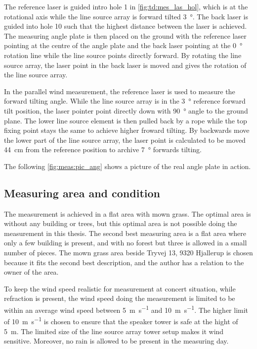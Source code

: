 The reference laser is guided intro hole 1 in \autoref{fig:td:mes_las_hol}, which is at the rotational axis while the line source array is forward tilted \SI{3}{\degree}. The back laser is guided into hole 10 such that the highest distance between the laser is achieved. The measuring angle plate is then placed on the ground with the reference laser pointing at the centre of the angle plate and the back laser pointing at the \SI{0}{\degree} rotation line while the line source points directly forward. By rotating the line source array, the laser point in the back laser is moved and gives the rotation of the line source array.

In the parallel wind measurement, the reference laser is used to measure the forward tilting angle. While the line source array is in the \SI{3}{\degree} reference forward tilt position, the laser pointer point directly down with \SI{90}{\degree} angle to the ground plane. The lower line source element is then pulled back by a rope while the top fixing point stays the same to achieve higher froward tilting. By backwards move the lower part of the line source array, the laser point is calculated to be moved \SI{44}{\centi\meter} from the reference position to archive \SI{7}{\degree} forwards tilting.

The following \autoref{fig:meas:pic_ang} shows a picture of the real angle plate in action.


\subsection{Measuring area and condition}
The measurement is achieved in a flat area with mown grass. The optimal area is without any building or trees, but this optimal area is not possible doing the measurement in this thesis. The second best measuring area is a flat area where only a few building is present, and with no forest but three is allowed in a small number of pieces. The mown grass area beside Tryvej 13, 9320 Hjallerup is chosen because it fits the second best description, and the author has a relation to the owner of the area.


To keep the wind speed realistic for measurement at concert situation, while refraction is present, the wind speed doing the measurement is limited to be within an average wind speed between \SI{5}{\meter\per\second} and \SI{10}{\meter\per\second}. The higher limit of  \SI{10}{\meter\per\second} is chosen to ensure that the speaker tower is safe at the hight of \SI{5}{\meter}. The limited size of the line source array tower setup makes it wind sensitive. Moreover, no rain is allowed to be present in the measuring day.

